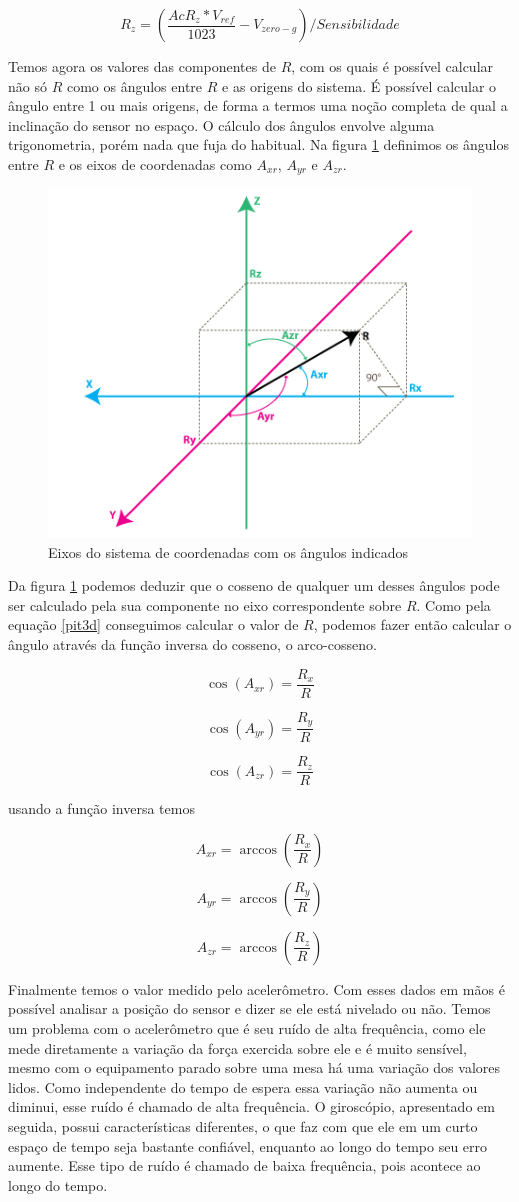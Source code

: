 \documentclass[a4paper,12pt]{article}
\begin{document}
$$R_z=(\frac{AcR_z\ast V_{ref}}{1023}-V_{zero-g})/Sensibilidade$$

Temos agora os valores das componentes de $R$, com os quais é possível calcular não só $R$ como os ângulos entre $R$ e as origens do sistema. É possível calcular o ângulo entre 1 ou mais origens, de forma a termos uma noção completa de qual a inclinação do sensor no espaço. O cálculo dos ângulos envolve alguma trigonometria, porém nada que fuja do habitual. Na figura \ref{eixos2} definimos os ângulos entre $R$ e os eixos de coordenadas como $A_{xr}$, $A_{yr}$ e $A_{zr}$.

\begin{figure}[H]
\centering
\includegraphics[width=.5\textwidth]{img/eixos2.png}
\caption{Eixos do sistema de coordenadas com os ângulos indicados}
\label{eixos2}
\end{figure}

Da figura \ref{eixos2} podemos deduzir que o cosseno de qualquer um desses ângulos pode ser calculado pela sua componente no eixo correspondente sobre $R$. Como pela equação \ref{pit3d} conseguimos calcular o valor de $R$, podemos fazer então calcular o ângulo através da função inversa do cosseno, o arco-cosseno.

$$\cos(A_{xr})=\frac{R_x}{R}$$

$$\cos(A_{yr})=\frac{R_y}{R}$$

$$\cos(A_{zr})=\frac{R_z}{R}$$

\noindent\medskip
usando a função inversa temos

$$A_{xr}=\arccos(\frac{R_x}{R})$$

$$A_{yr}=\arccos(\frac{R_y}{R})$$

$$A_{zr}=\arccos(\frac{R_z}{R})$$

Finalmente temos o valor medido pelo acelerômetro. Com esses dados em mãos é possível analisar a posição do sensor e dizer se ele está nivelado ou não. Temos um problema com o acelerômetro que é seu ruído de alta frequência, como ele mede diretamente a variação da força exercida sobre ele e é muito sensível, mesmo com o equipamento parado sobre uma mesa há uma variação dos valores lidos. Como independente do tempo de espera essa variação não aumenta ou diminui, esse ruído é chamado de alta frequência. O giroscópio, apresentado em seguida, possui características diferentes, o que faz com que ele em um curto espaço de tempo seja bastante confiável, enquanto ao longo do tempo seu erro aumente. Esse tipo de ruído é chamado de baixa frequência, pois acontece ao longo do tempo.
\end{document}
